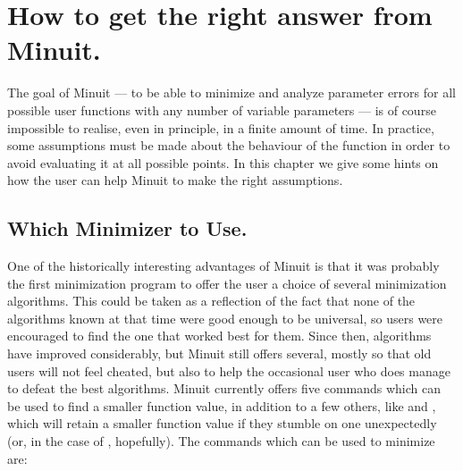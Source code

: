  
\chapter{How to get the right answer from Minuit.}

The goal of Minuit --- to be able to minimize and analyze parameter
errors for all possible user functions with any number of variable
parameters --- is of course impossible to realise, even in principle,
in a finite amount of time. In practice, some assumptions must be made
about the behaviour of the function in order to avoid evaluating it
at all possible points.
In this chapter we give some hints on how the user can help Minuit
to make the right assumptions.

\section{Which Minimizer to Use.}

One of the historically interesting advantages of Minuit is that it
was probably the first minimization program to offer the user a choice
of several minimization algorithms.
This could be taken as a reflection of the fact that none of the
algorithms known at that time were good enough to be universal, so
users were encouraged to find the one that worked best for them.
Since then, algorithms have improved considerably, but Minuit still
offers several, mostly so that old users will not feel cheated, but also to
help the occasional user who does manage to defeat the best algorithms.
Minuit currently offers five commands which can be used to find a
smaller function value, in addition to a few others,
like  and ,
which will retain a smaller function value if they stumble on one
unexpectedly (or, in the case of , hopefully).
The commands which can be used to minimize are:

